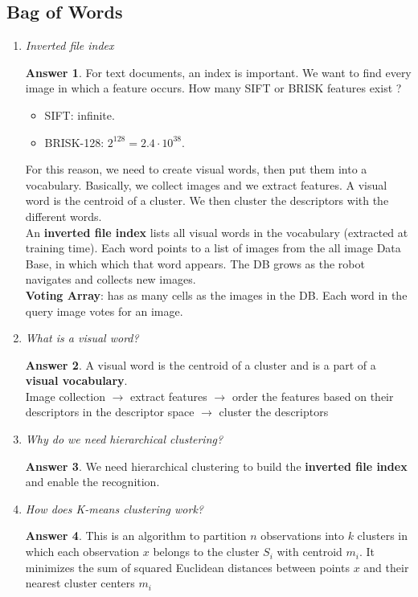 \documentclass[a4paper,12 pt]{article}
\theoremstyle{definition}
\theoremstyle{remark}
\theoremstyle{definition}
\theoremstyle{definition}
\theoremstyle{definition}
\theoremstyle{definition}
\theoremstyle{remark}
\theoremstyle{remark}
\theoremstyle{definition}
\theoremstyle{definition}
\newtheorem*{answer}{Answer}
\begin{document}
\subsection*{Bag of Words}
\begin{enumerate}
\item \textit{Inverted file index}
\begin{answer}
For text documents, an index is important. We want to find every image in which a feature occurs. How many SIFT or BRISK features exist ?
\begin{itemize}
\item SIFT: infinite.
\item BRISK-128: $2^{128}=2.4\cdot 10^{38}$.
\end{itemize}
For this reason, we need to create visual words, then put them into a vocabulary. Basically, we collect images and we extract features. A visual word is the centroid of a cluster. We then cluster the descriptors with the different words.\\
An \textbf{inverted file index} lists all visual words in the vocabulary (extracted at training time). Each word points to a list of images from the all image Data Base, in which which that word appears. The DB grows as the robot navigates and collects new images.\\
 \textbf{Voting Array}: has as many cells as the images in the DB. Each word in the query image votes for an image.
\end{answer}
\item \textit{What is a visual word?}
\begin{answer}
 A visual word is the centroid of a cluster and is a part of a \textbf{visual vocabulary}. \\
 Image collection $\rightarrow$ extract features $\rightarrow$ order the features based on their descriptors in the descriptor space $\rightarrow$ cluster the descriptors 
\end{answer}
\item \textit{ Why do we need hierarchical clustering? }
\begin{answer}
We need hierarchical clustering to build the \textbf{inverted file index} and enable the recognition.
\end{answer}
\item \textit{How does K-means clustering work?}
\begin{answer}
This is an algorithm to partition $n$ observations into $k$ clusters in which each observation $x$ belongs to the cluster $S_i$ with centroid $m_i$. It minimizes the sum of squared Euclidean distances between points $x$ and their nearest cluster centers $m_i$

\end{answer}
\end{enumerate}
\end{document}
